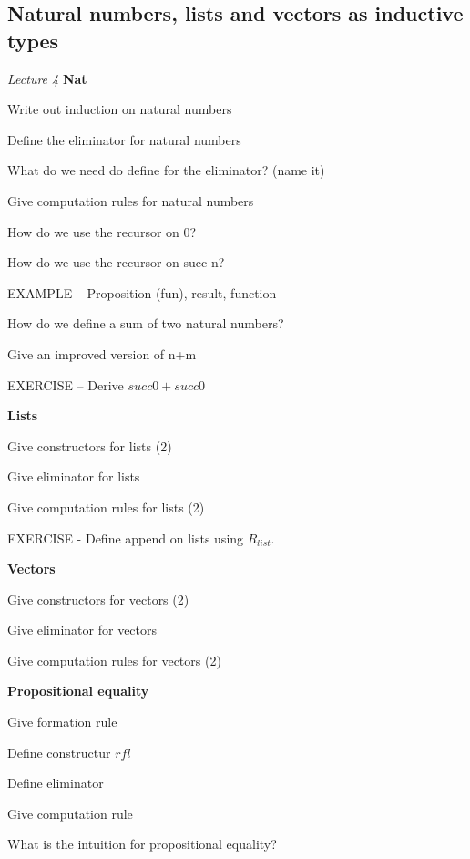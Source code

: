 \documentclass[fleqn]{article}
\begin{document}
\subsection{Natural numbers, lists and vectors as inductive types}
\textit{Lecture 4}
\textbf{Nat}
\begin{enumerate}
    {\color{blue}\item Write out induction on natural numbers}
    {\color{red}\item Define the eliminator for natural numbers}
    {\color{red}\item What do we need do define for the eliminator? (name it)}
    \item Give computation rules for natural numbers
    \begin{itemize}
        {\color{red}\item How do we use the recursor on 0?}
        {\color{blue}\item How do we use the recursor on succ n?   } 
    \end{itemize}
    {\color{blue}\item EXAMPLE -- Proposition (fun), result, function}
    {\color{blue}\item How do we define a sum of two natural numbers?}
    {\color{blue}\item Give an improved version of n+m}
    \item EXERCISE -- Derive $succ 0 + succ 0$
\end{enumerate}

\textbf{Lists}
\begin{enumerate}
    {\color{red}\item Give constructors for lists (2)}
    {\color{blue}\item Give eliminator for lists}
    {\color{red}\item Give computation rules for lists (2)}
    \item EXERCISE - Define append on lists using $R_{list}$.
\end{enumerate}

\textbf{Vectors}
\begin{enumerate}
    {\color{red}\item Give constructors for vectors (2)}
    {\color{blue}\item Give eliminator for vectors}
    {\color{red}\item Give computation rules for vectors (2)}
\end{enumerate}

\textbf{Propositional equality}
\begin{enumerate}
    {\color{blue}\item Give formation rule}
    {\color{blue}\item Define constructur $rfl$}
    {\color{blue}\item Define eliminator}
    {\color{blue}\item Give computation rule}
    {\color{red}\item What is the intuition for propositional equality?}
\end{enumerate}
\end{document}
